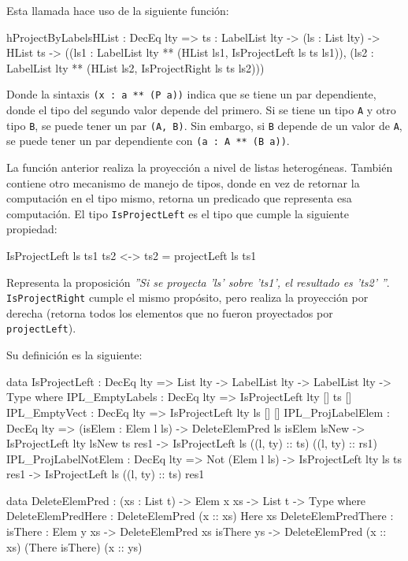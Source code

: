 
Esta llamada hace uso de la siguiente función:

\begin{code}
hProjectByLabelsHList : DecEq lty => {ts : LabelList lty} ->
  (ls : List lty) -> HList ts ->
  ((ls1 : LabelList lty ** (HList ls1, IsProjectLeft ls ts ls1)),
  (ls2 : LabelList lty ** (HList ls2, IsProjectRight ls ts ls2)))
\end{code}

Donde la sintaxis \texttt{(x : a ** (P a))} indica que se tiene un par dependiente, donde el tipo del segundo valor depende del primero. Si se tiene un tipo \texttt{A} y otro tipo \texttt{B}, se puede tener un par \texttt{(A, B)}. Sin embargo, si \texttt{B} depende de un valor de \texttt{A}, se puede tener un par dependiente con \texttt{(a : A ** (B a))}.

La función anterior realiza la proyección a nivel de listas heterogéneas. También contiene otro mecanismo de manejo de tipos, donde en vez de retornar la computación en el tipo mismo, retorna un predicado que representa esa computación. El tipo \texttt{IsProjectLeft} es el tipo que cumple la siguiente propiedad:

\begin{code}
IsProjectLeft ls ts1 ts2 <-> ts2 = projectLeft ls ts1
\end{code}

Representa la proposición \textit{''Si se proyecta 'ls' sobre 'ts1', el resultado es 'ts2' ''}. \texttt{IsProjectRight} cumple el mismo propósito, pero realiza la proyección por derecha (retorna todos los elementos que no fueron proyectados por \texttt{projectLeft}).

Su definición es la siguiente:

\begin{code}
data IsProjectLeft : DecEq lty => List lty -> LabelList lty ->
  LabelList lty -> Type where
  IPL_EmptyLabels : DecEq lty => IsProjectLeft {lty} [] ts []
  IPL_EmptyVect : DecEq lty => IsProjectLeft {lty} ls [] []
  IPL_ProjLabelElem : DecEq lty => (isElem : Elem l ls) ->
    DeleteElemPred ls isElem lsNew ->
    IsProjectLeft {lty} lsNew ts res1 ->
    IsProjectLeft ls ((l, ty) :: ts) ((l, ty) :: rs1)
  IPL_ProjLabelNotElem : DecEq lty => Not (Elem l ls) ->
    IsProjectLeft {lty} ls ts res1 ->
    IsProjectLeft ls ((l, ty) :: ts) res1

data DeleteElemPred : (xs : List t) -> Elem x xs ->
  List t -> Type where
  DeleteElemPredHere : DeleteElemPred (x :: xs) Here xs
  DeleteElemPredThere : {isThere : Elem y xs} ->
    DeleteElemPred xs isThere ys ->
    DeleteElemPred (x :: xs) (There isThere) (x :: ys)
\end{code}

